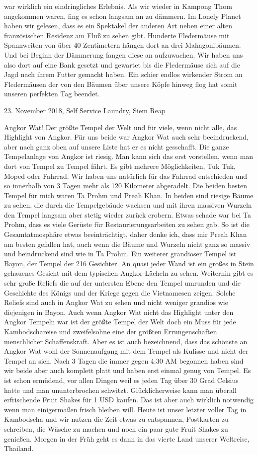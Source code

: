 \documentclass[11pt]{book}
\begin{document}
war wirklich ein eindringliches Erlebnis. Als wir wieder in Kampong Thom angekommen waren, fing es schon langsam an zu dämmern. 
Im Lonely Planet haben wir gelesen, dass es ein Spektakel der anderen Art neben einer alten französischen Residenz am Fluß zu sehen 
gibt. Hunderte Fledermäuse mit Spannweiten von über 40 Zentimetern hängen dort an drei Mahagonibäumen. Und bei Beginn der Dämmerung 
fangen diese an aufzuwachen. Wir haben uns also dort auf eine Bank gesetzt und gewartet bis die Fledermäuse sich auf die Jagd nach 
ihrem Futter gemacht haben. Ein schier endlos wirkender Strom an Fledermäusen der von den Bäumen über unsere Köpfe hinweg flog hat 
somit unseren perfekten Tag beendet.

23. November 2018, Self Service Laundry, Siem Reap

Angkor Wat! Der größte Tempel der Welt und für viele, wenn nicht alle, das Highlight von Angkor. Für uns beide war Angkor Wat 
auch sehr beeindruckend, aber nach ganz oben auf unsere Liste hat er es nicht gesschafft. Die ganze Tempelanlage von Angkor ist 
riesig. Man kann sich das erst vorstellen, wenn man dort von Tempel zu Tempel fährt. Es gibt mehrere Möglichkeiten, Tuk Tuk, Moped 
oder Fahrrad. Wir haben uns natürlich für das Fahrrad entschieden und so innerhalb von 3 Tagen mehr als 120 Kilometer abgeradelt.
Die beiden besten Tempel für mich waren Ta Prohm und Preah Khan. In beiden sind riesige Bäume zu sehen, die durch die Tempelgebäude 
wachsen und mit ihren massiven Wurzeln den Tempel langsam aber stetig wieder zurück erobern. Etwas schade war bei Ta Prohm, dass es 
viele Gerüste für Restaurierungsarbeiten zu sehen gab. So ist die Gesamtatmosphäre etwas beeinträchtigt, daher denke ich, dass mir 
Preah Khan am besten gefallen hat, auch wenn die Bäume und Wurzeln nicht ganz so massiv und beindruckend sind wie in Ta Prohm. Ein 
weiterer grandioser Tempel ist Bayon, der Tempel der 216 Gesichter. An quasi jeder Wand ist ein großes in Stein gehauenes Gesicht mit 
dem typischen Angkor-Lächeln zu sehen. Weiterhin gibt es sehr große Reliefs die auf der untersten Ebene den Tempel umrunden und die 
Geschichte des Königs und der Kriege gegen die Vietnamesen zeigen. Solche Reliefs sind auch in Angkor Wat zu sehen und nicht weniger 
grandios wie diejenigen in Bayon. Auch wenn Angkor Wat nicht das Highlight unter den Angkor Tempeln war ist der größte Tempel der 
Welt doch ein Muss für jede Kambodschareise und zweifelsohne eine der größten Errungenschaften menschlicher Schaffenskraft. Aber es 
ist auch bezeichnend, dass das schönste an Angkor Wat wohl der Sonnenaufgang mit dem Tempel als Kulisse und nicht der Tempel an sich.
Nach 3 Tagen die immer gegen 4:30 AM begonnen haben sind wir beide aber auch komplett platt und haben erst einmal genug von Tempel.
Es ist schon ermüdend, vor allen Dingen weil es jeden Tag über 30 Grad Celsius hatte und man ununterbrochen schwitzt. Glücklicherweise 
kann man überall erfrischende Fruit Shakes für 1 USD kaufen. Das ist aber auch wirklich notwendig wenn man einigermaßen frisch bleiben 
will. Heute ist unser letzter voller Tag in Kambodscha und wir nutzen die Zeit etwas zu entspannen, Postkarten zu schreiben, die 
Wäsche zu machen und noch ein paar gute Fruit Shakes zu genießen. Morgen in der Früh geht es dann in das vierte Land unserer Weltreise, 
Thailand.
\end{document}
